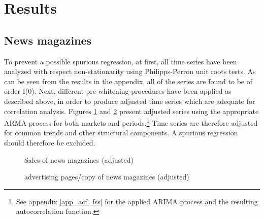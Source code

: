 \documentclass[12pt,a4paper]{scrreprt}
\begin{document}

\section{Results}

\subsection{News magazines}

To prevent a possible spurious regression, at first, all time series have been analyzed with respect non-stationarity using Philipps-Perron unit roots tests. As can be seen from the results in the appendix, all of the series are found to be of order I(0). Next, different pre-whitening procedures have been applied as described above, in order to produce adjusted time series which are adequate for correlation analysis. Figures \ref{arima_circ_fss1} and \ref{arima_ads_fss1} present adjusted series using the appropriate ARMA process for both markets and periods.\footnote{See appendix \ref{app_acf_fss} for the applied ARIMA process and the resulting autocorrelation function.} Time series are therefore adjusted for common trends and other structural components. A spurious regression should therefore be excluded.  

\begin{figure}[H]
\caption{Sales of news magazines (adjusted)}
\begin{minipage}
	\centering
	
\end{minipage}
\hfil
\begin{minipage}
	\centering
	
\end{minipage}
\label{arima_circ_fss1}
\end{figure}

\begin{figure}[H]
\caption{advertising pages/copy of news magazines (adjusted)}
\begin{minipage}
	\centering
	
\end{minipage}
\hfil
\begin{minipage}
	\centering
	
\end{minipage}
\label{arima_ads_fss1}
\end{figure}
\end{document}
